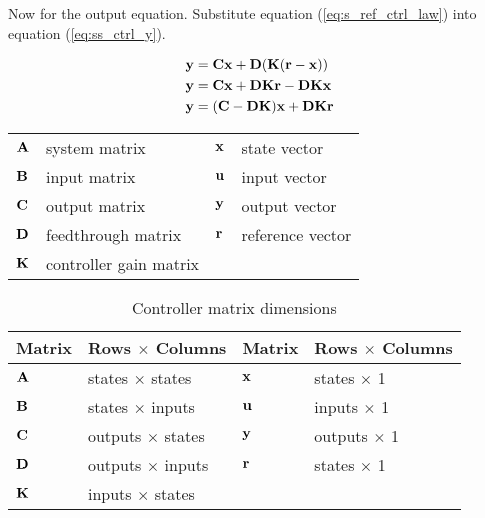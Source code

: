 Now for the output equation. Substitute equation (\ref{eq:s_ref_ctrl_law}) into
equation (\ref{eq:ss_ctrl_y}).

\begin{align}
  \mathbf{y} &= \mathbf{C}\mathbf{x} + \mathbf{D}(\mathbf{K}(\mathbf{r} - \mathbf{x})) \nonumber \\
  \mathbf{y} &= \mathbf{C}\mathbf{x} + \mathbf{D}\mathbf{K}\mathbf{r} - \mathbf{D}\mathbf{K}\mathbf{x}
    \nonumber \\
  \mathbf{y} &= (\mathbf{C} - \mathbf{D}\mathbf{K})\mathbf{x} + \mathbf{D}\mathbf{K}\mathbf{r}
    \label{eq:s_ref_ctrl_y}
\end{align}

\begin{center}
  \renewcommand{\arraystretch}{1.3}
  \begin{tabulary}{\linewidth}{LLLL}
    $\mathbf{A}$ & system matrix      & $\mathbf{x}$ & state vector \\
    $\mathbf{B}$ & input matrix       & $\mathbf{u}$ & input vector \\
    $\mathbf{C}$ & output matrix      & $\mathbf{y}$ & output vector \\
    $\mathbf{D}$ & feedthrough matrix & $\mathbf{r}$ & \gls{reference} vector \\
    $\mathbf{K}$ & controller gain matrix &  &  \\
  \end{tabulary}
\end{center}

\begin{table}[h]
  \renewcommand{\arraystretch}{1.5}
  \centering
  \begin{tabular}{|ll|ll|}
    \hline
    \rowcolor{headingbg}
    \textbf{Matrix} & \textbf{Rows $\times$ Columns} &
    \textbf{Matrix} & \textbf{Rows $\times$ Columns} \\
    \hline
    $\mathbf{A}$ & states $\times$ states & $\mathbf{x}$ & states $\times$ 1 \\
    $\mathbf{B}$ & states $\times$ inputs & $\mathbf{u}$ & inputs $\times$ 1 \\
    $\mathbf{C}$ & outputs $\times$ states & $\mathbf{y}$ & outputs $\times$ 1 \\
    $\mathbf{D}$ & outputs $\times$ inputs & $\mathbf{r}$ & states $\times$ 1 \\
    $\mathbf{K}$ & inputs $\times$ states &  &  \\
    \hline
  \end{tabular}
  \caption{Controller matrix dimensions}
  \label{tab:ctrl_matrix_dims}
\end{table}

